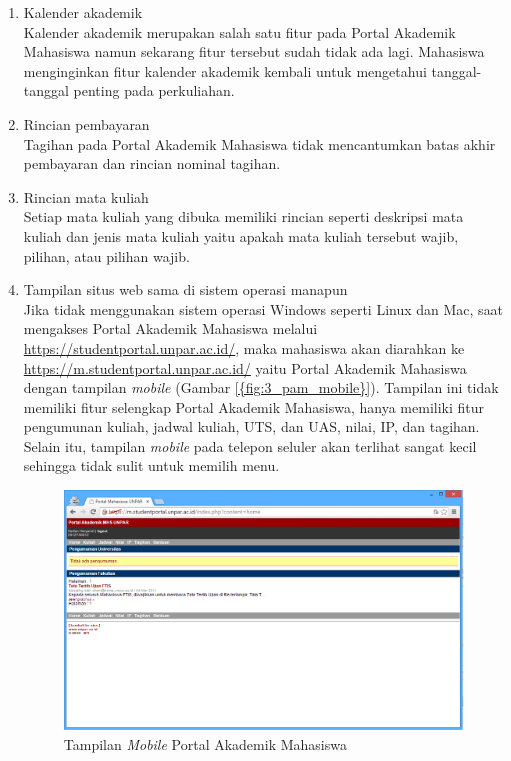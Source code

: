 \begin{enumerate}
	\item Kalender akademik\\
	Kalender akademik merupakan salah satu fitur pada Portal Akademik Mahasiswa namun sekarang fitur tersebut sudah tidak ada lagi. Mahasiswa menginginkan fitur kalender akademik kembali untuk mengetahui tanggal-tanggal penting pada perkuliahan. 
	\item Rincian pembayaran\\
	Tagihan pada Portal Akademik Mahasiswa tidak mencantumkan batas akhir pembayaran dan rincian nominal tagihan.
	\item Rincian mata kuliah\\
	Setiap mata kuliah yang dibuka memiliki rincian seperti deskripsi mata kuliah dan jenis mata kuliah yaitu apakah mata kuliah tersebut wajib, pilihan, atau pilihan wajib.
	\item Tampilan situs web sama di sistem operasi manapun\\
	Jika tidak menggunakan sistem operasi Windows seperti Linux dan Mac, saat mengakses Portal Akademik Mahasiswa melalui \url{https://studentportal.unpar.ac.id/}, maka mahasiswa akan diarahkan ke \url{https://m.studentportal.unpar.ac.id/} yaitu Portal Akademik Mahasiswa dengan tampilan \textit{mobile} (Gambar \ref{{fig:3_pam_mobile}}). Tampilan ini tidak memiliki fitur selengkap Portal Akademik Mahasiswa, hanya memiliki fitur pengumunan kuliah, jadwal kuliah, UTS, dan UAS, nilai, IP, dan tagihan. Selain itu, tampilan \textit{mobile} pada telepon seluler akan terlihat sangat kecil sehingga tidak sulit untuk memilih menu.
	\begin{figure}[H]
			\centering
			\includegraphics[scale=0.5]{Gambar/pam-mobile}
			\caption{Tampilan \textit{Mobile} Portal Akademik Mahasiswa} 
			\label{fig:3_pam_mobile}
		\end{figure}

\end{enumerate}
